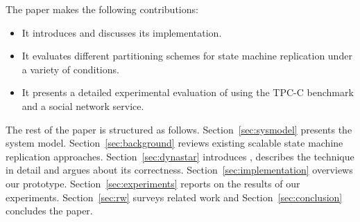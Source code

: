 The paper makes the following contributions:
\begin{itemize}
\item It introduces \dynastar and discusses its implementation. 
\item It evaluates different partitioning schemes for state machine replication under a variety of conditions.
\item It presents a detailed experimental evaluation of \dynastar using the TPC-C benchmark and a social network service.

\end{itemize}

The rest of the paper is structured as follows.
Section~\ref{sec:sysmodel} presents the system model.
Section~\ref{sec:background} reviews existing scalable state machine replication approaches.
Section~\ref{sec:dynastar} introduces \dynastar, describes the technique in detail and argues about its correctness.
Section~\ref{sec:implementation} overviews our prototype.
Section~\ref{sec:experiments} reports on the results of our experiments.
Section~\ref{sec:rw} surveys related work and
Section~\ref{sec:conclusion} concludes the paper.
